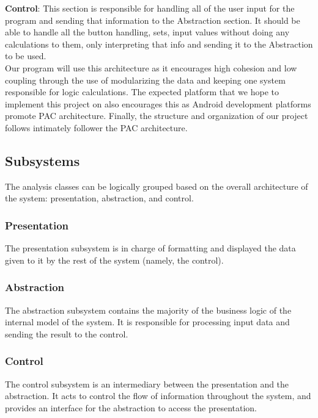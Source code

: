 \documentclass[]{article}
\begin{document}
\textbf{Control}: This section is responsible for handling all of the user input
for the program and sending that information to the Abstraction section. It should
be able to handle all the button handling, sets, input values without doing any
calculations to them, only interpreting that info and sending it to the Abstraction to be used. \\

Our program will use this architecture as it encourages high cohesion and low coupling
through the use of modularizing the data and keeping one system responsible for logic calculations.
The expected platform that we hope to implement this project on also encourages this as
Android development platforms promote PAC architecture. Finally, the structure and
organization of our project follows intimately follower the PAC architecture.


\subsection{Subsystems}
\label{sub:subsystems}

The analysis classes can be logically grouped based on the overall architecture
of the system: presentation, abstraction, and control.

\subsubsection{Presentation}

The presentation subsystem is in charge of formatting and displayed the data given
to it by the rest of the system (namely, the control).

\subsubsection{Abstraction}

The abstraction subsystem contains the majority of the business logic of the
internal model of the system. It is responsible for processing input data and
sending the result to the control.

\subsubsection{Control}

The control subsystem is an intermediary between the presentation and the
abstraction. It acts to control the flow of information throughout the system,
and provides an interface for the abstraction to access the presentation.
\end{document}

